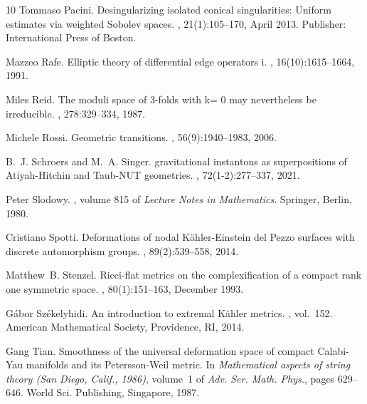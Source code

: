 \documentclass[a4paper,11pt]{article}
\begin{document}
\begin{thebibliography}{10}
Tommaso Pacini.
\newblock Desingularizing isolated conical singularities: {Uniform} estimates via weighted {Sobolev} spaces.
, 21(1):105--170, April 2013.
\newblock Publisher: International Press of Boston.

Mazzeo Rafe.
\newblock Elliptic theory of differential edge operators i.
, 16(10):1615--1664, 1991.

Miles Reid.
\newblock The moduli space of 3-folds with k= 0 may nevertheless be irreducible.
, 278:329--334, 1987.

Michele Rossi.
\newblock Geometric transitions.
, 56(9):1940--1983, 2006.

B.~J. Schroers and M.~A. Singer.
 gravitational instantons as superpositions of
  {A}tiyah-{H}itchin and {T}aub-{NUT} geometries.
, 72(1-2):277--337, 2021.


Peter Slodowy.
, volume 815 of {\em Lecture Notes in Mathematics}.
\newblock Springer, Berlin, 1980.

Cristiano Spotti.
\newblock Deformations of nodal {K}\"ahler-{E}instein del {P}ezzo surfaces with discrete automorphism groups.
, 89(2):539--558, 2014.

Matthew~B. Stenzel.
\newblock Ricci-flat metrics on the complexification of a compact rank one symmetric space.
, 80(1):151--163, December 1993.

G{\'a}bor Sz{\'e}kelyhidi.
\newblock An introduction to extremal {K\"ahler} metrics.
, vol.~152.
\newblock American Mathematical Society, Providence, RI, 2014.

Gang Tian.
\newblock Smoothness of the universal deformation space of compact
  {C}alabi-{Y}au manifolds and its {P}etersson-{W}eil metric.
\newblock In {\em Mathematical aspects of string theory ({S}an {D}iego,
  {C}alif., 1986)}, volume~1 of {\em Adv. Ser. Math. Phys.}, pages 629--646.
  World Sci. Publishing, Singapore, 1987.


\end{thebibliography}
\end{document}
